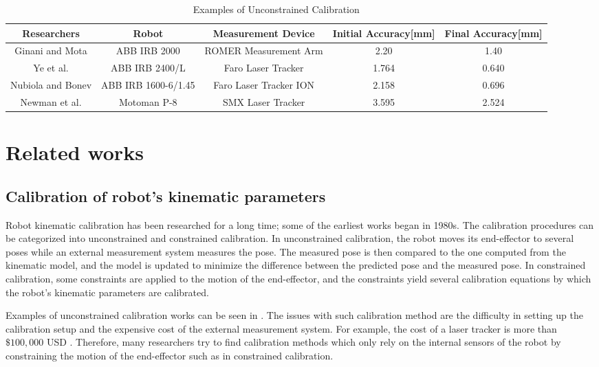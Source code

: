 \renewcommand{\arraystretch}{1.5}
\begin{table*}[htp]
\caption{Examples of Unconstrained Calibration}
\label{tab:unconstrained_calib}
\centering
\begin{tabular}{c c c c c}
\toprule
\textbf{Researchers} &  \textbf{Robot} & \textbf{Measurement Device} &  \textbf{Initial Accuracy[mm]}  & \textbf{Final Accuracy[mm]}\\
\midrule
Ginani and Mota \cite{Ginani2011} & ABB IRB 2000 & ROMER Measurement Arm & 2.20 & 1.40 \\
Ye et al. \cite{Ye2006} & ABB IRB 2400/L & Faro Laser Tracker & 1.764 & 0.640 \\
Nubiola and Bonev \cite{Nubiola2013} & ABB IRB 1600-6/1.45 & Faro Laser Tracker ION & 2.158 & 0.696 \\ 
Newman et al. \cite{Newman2000} & Motoman P-8 & SMX Laser Tracker & 3.595 & 2.524\\
\bottomrule
\end{tabular}
\end{table*}

\section{Related works}
\label{sec:related}
\subsection{Calibration of robot's kinematic parameters}
\label{sec:kine_calib}



Robot kinematic calibration has been researched for a long time; some of the earliest works began in 1980s. The calibration procedures can be categorized into unconstrained and constrained calibration. In unconstrained calibration, the robot moves its end-effector to several poses while an external measurement system measures the pose. The measured pose is then compared to the one computed from the kinematic model, and the model is updated to minimize the difference between the predicted pose and the measured pose. In constrained calibration, some constraints are applied to the motion of the end-effector, and the constraints yield several calibration equations by which the robot's kinematic parameters are calibrated. 


Examples of unconstrained calibration works can be seen in . The issues with such calibration method are the difficulty in setting up the calibration setup and the expensive cost of the external measurement system. For example, the cost of a laser tracker is more than $\$100,000$ USD \cite{Nubiola2013}. Therefore, many researchers try to find calibration methods which only rely on the internal sensors of the robot by constraining the motion of the end-effector such as in constrained calibration. 


